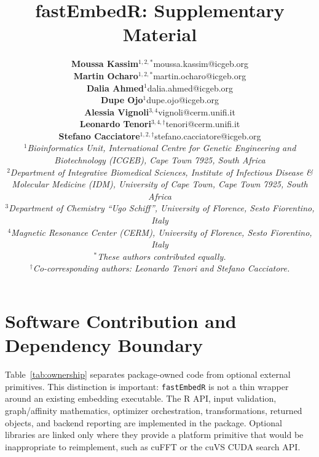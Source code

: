 \documentclass[twoside,11pt]{article}
\newcommand{\pkg}{\texttt{fastEmbedR}}
\begin{document}
\title{fastEmbedR: Supplementary Material}

\author{{\small\bf Moussa Kassim$^{1,2,\ast}$}\hfill{\footnotesize\sc moussa.kassim@icgeb.org}\\[-1pt]
{\small\bf Martin Ocharo$^{1,2,\ast}$}\hfill{\footnotesize\sc martin.ocharo@icgeb.org}\\[-1pt]
{\small\bf Dalia Ahmed$^{1}$}\hfill{\footnotesize\sc dalia.ahmed@icgeb.org}\\[-1pt]
{\small\bf Dupe Ojo$^{1}$}\hfill{\footnotesize\sc dupe.ojo@icgeb.org}\\[-1pt]
{\small\bf Alessia Vignoli$^{3,4}$}\hfill{\footnotesize\sc vignoli@cerm.unifi.it}\\[-1pt]
{\small\bf Leonardo Tenori$^{3,4,\dagger}$}\hfill{\footnotesize\sc tenori@cerm.unifi.it}\\[-1pt]
{\small\bf Stefano Cacciatore$^{1,2,\dagger}$}\hfill{\footnotesize\sc stefano.cacciatore@icgeb.org}\\[-1pt]
{\footnotesize\it $^1$Bioinformatics Unit, International Centre for Genetic Engineering and Biotechnology (ICGEB), Cape Town 7925, South Africa\\
$^2$Department of Integrative Biomedical Sciences, Institute of Infectious Disease \& Molecular Medicine (IDM), University of Cape Town, Cape Town 7925, South Africa\\
$^3$Department of Chemistry ``Ugo Schiff'', University of Florence, Sesto Fiorentino, Italy\\
$^4$Magnetic Resonance Center (CERM), University of Florence, Sesto Fiorentino, Italy\\
$^\ast$These authors contributed equally.\\
$^\dagger$Co-corresponding authors: Leonardo Tenori and Stefano Cacciatore.}}

\maketitle

\section{Software Contribution and Dependency Boundary}

Table~\ref{tab:ownership} separates package-owned code from optional external primitives. This distinction is important: \pkg{} is not a thin wrapper around an existing embedding executable. The R API, input validation, graph/affinity mathematics, optimizer orchestration, transformations, returned objects, and backend reporting are implemented in the package. Optional libraries are linked only where they provide a platform primitive that would be inappropriate to reimplement, such as cuFFT or the cuVS CUDA search API.
\end{document}
